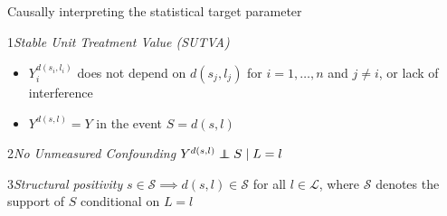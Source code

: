 \documentclass{beamer}
\begin{document}
\begin{frame}[c]{Causally interpreting the statistical target parameter}

\begin{center}
\begin{tcolorbox}
\begin{assumption}{1}{\textit{Stable Unit Treatment Value (SUTVA)}}\label{sutva}
  \begin{itemize}
    \itemsep2pt
    \item $Y^{d(s_i, l_i)}_i$ does not depend on $d(s_j, l_j)$ for
        $i = 1, \ldots, n$ and $j \neq i$, or lack of
        interference~\citep{cox1958planning}
     \item $Y^{d(s, l)} = Y$ in the event $S = d(s, l)$
  \end{itemize}
\end{assumption}
\end{tcolorbox}
\vspace{-0.7em}
\begin{tcolorbox}
\begin{assumption}{2}{\textit{No Unmeasured Confounding}}\label{ignorability}
  $Y^{d(s, l)} \indep S \mid L = l$
\end{assumption}
\end{tcolorbox}
\vspace{-0.7em}
\begin{tcolorbox}
\begin{assumption}{3}{\textit{Structural positivity}}\label{positivity}
  $s \in \mathcal{S} \implies d(s, l) \in \mathcal{S}$ for all
  $l \in \mathcal{L}$, where $\mathcal{S}$ denotes the support of $S$
  conditional on $L = l$
\end{assumption}
\end{tcolorbox}
\end{center}

\end{frame}

\end{document}
